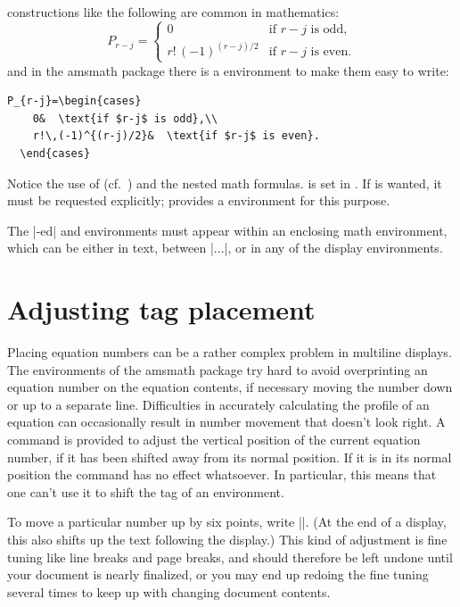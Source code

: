 \documentclass[leqno,titlepage,openany]{amsldoc}[1999/12/13]
\makeatletter
\newcommand{\nipkg}{\textsf}
\let\oldcs\cs
\def\cs#1{\texorpdfstring{\oldcs{#1}}{\@backslashchar\@backslashchar#1}}
\let\cn\cs
\makeatother
\begin{document}
 constructions like the following are common in
mathematics:
\begin{equation}\label{eq:C}
P_{r-j}=
  \begin{cases}
    0&  \text{if $r-j$ is odd},\\
    r!\,(-1)^{(r-j)/2}&  \text{if $r-j$ is even}.
  \end{cases}
\end{equation}
and in the \nipkg{amsmath} package there is a  environment to
make them easy to write:
\begin{verbatim}
P_{r-j}=\begin{cases}
    0&  \text{if $r-j$ is odd},\\
    r!\,(-1)^{(r-j)/2}&  \text{if $r-j$ is even}.
  \end{cases}
\end{verbatim}
Notice the use of \cn{text} (cf.~) and the nested math
formulas.  is set in \cn{textstyle}. If \cn{displaystyle}
is wanted, it must be requested explicitly;  provides
a  environment for this purpose.

The |-ed| and 
environments must appear within an enclosing math environment, which can
be either in text, between |$...$|, or in any of the display environments.


\section{Adjusting tag placement}

Placing equation numbers can be a rather complex problem in multiline
displays. The environments of the \nipkg{amsmath} package try hard to
avoid overprinting an equation number on the equation contents, if
necessary moving the number down or up to a separate line. Difficulties
in accurately calculating the profile of an equation can occasionally
result in number movement that doesn't look right.
A \cn{raisetag} command is provided to adjust the vertical position of the
current equation number, if it has been shifted away from its normal
position. If it is in its normal position the command has no effect whatsoever.
In particular, this means that one can't use it to shift the tag of an 
environment.

To move a particular number up by six points, write
|\raisetag{6pt}|. (At the end of a display, this also shifts up the
text following the display.)
This kind of adjustment is fine tuning like line
breaks and page breaks, and should therefore be left undone until your
document is nearly finalized, or you may end up redoing the fine tuning
several times to keep up with changing document contents.
\end{document}
